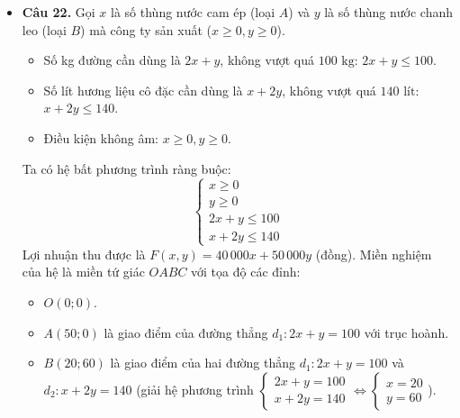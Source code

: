 \documentclass[12pt,a4paper]{article}
\begin{document}
\begin{itemize}[leftmargin=0.6cm, itemsep=4pt]
\begin{enumerate}
    \item Thay các giá trị lượng giác vào biểu thức $P$:
    \begin{itemize}
        \item Tử số: $13\sin \alpha + 26\cos \alpha = 13 \cdot \dfrac{12}{13} + 26 \cdot \left(-\dfrac{5}{13}\right) = 12 - 10 = 2$.
        \item Mẫu số: $5\tan \alpha + 12\cot \alpha = 5 \cdot \left(-\dfrac{12}{5}\right) + 12 \cdot \left(-\dfrac{5}{12}\right) = -12 - 5 = -17$.
    \end{itemize}
    Vậy giá trị của biểu thức là:
    $$P = \dfrac{2}{-17} = -\dfrac{2}{17}$$
\end{enumerate}

\item \textbf{Câu 22.}
Gọi $x$ là số thùng nước cam ép (loại $A$) và $y$ là số thùng nước chanh leo (loại $B$) mà công ty sản xuất ($x \ge 0, y \ge 0$).
\begin{itemize}
    \item Số kg đường cần dùng là $2x + y$, không vượt quá $100\text{ kg}$: $2x + y \le 100$.
    \item Số lít hương liệu cô đặc cần dùng là $x + 2y$, không vượt quá $140\text{ lít}$: $x + 2y \le 140$.
    \item Điều kiện không âm: $x \ge 0, y \ge 0$.
\end{itemize}
Ta có hệ bất phương trình ràng buộc:
$$\begin{cases} x \ge 0 \\ y \ge 0 \\ 2x + y \le 100 \\ x + 2y \le 140 \end{cases}$$
Lợi nhuận thu được là $F(x, y) = 40\,000x + 50\,000y$ (đồng).
Miền nghiệm của hệ là miền tứ giác $OABC$ với tọa độ các đỉnh:
\begin{itemize}
    \item $O(0; 0)$.
    \item $A(50; 0)$ là giao điểm của đường thẳng $d_1: 2x + y = 100$ với trục hoành.
    \item $B(20; 60)$ là giao điểm của hai đường thẳng $d_1: 2x + y = 100$ và $d_2: x + 2y = 140$ (giải hệ phương trình $\begin{cases} 2x + y = 100 \\ x + 2y = 140 \end{cases} \iff \begin{cases} x = 20 \\ y = 60 \end{cases}$).

\end{itemize}
\end{itemize}
\end{document}
